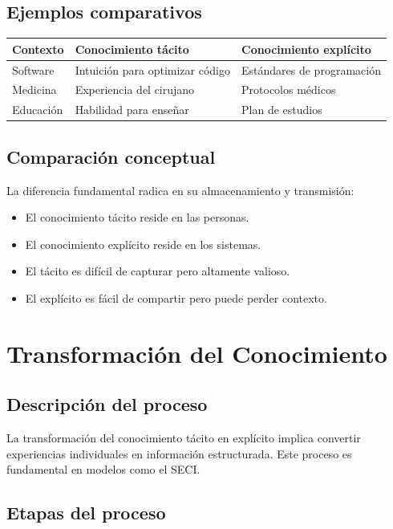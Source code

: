 \documentclass[12pt,a4paper]{article}
\begin{document}
\subsection{Ejemplos comparativos}

\begin{center}
\begin{tabular}{|m{4cm}|m{4cm}|m{4cm}|}
\hline
\textbf{Contexto} & \textbf{Conocimiento tácito} & \textbf{Conocimiento explícito} \\
\hline
Software & Intuición para optimizar código & Estándares de programación \\
\hline
Medicina & Experiencia del cirujano & Protocolos médicos \\
\hline
Educación & Habilidad para enseñar & Plan de estudios \\
\hline
\end{tabular}
\end{center}

\subsection{Comparación conceptual}
La diferencia fundamental radica en su almacenamiento y transmisión:

\begin{itemize}
    \item El conocimiento tácito reside en las personas.
    \item El conocimiento explícito reside en los sistemas.
    \item El tácito es difícil de capturar pero altamente valioso.
    \item El explícito es fácil de compartir pero puede perder contexto.
\end{itemize}

\section{Transformación del Conocimiento}

\subsection{Descripción del proceso}
La transformación del conocimiento tácito en explícito implica convertir experiencias individuales en información estructurada. Este proceso es fundamental en modelos como el SECI.

\subsection{Etapas del proceso}
\end{document}
